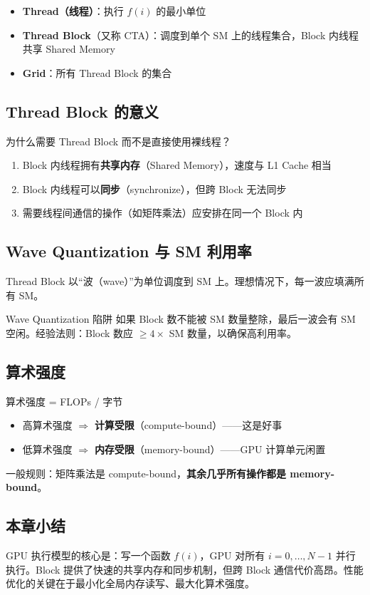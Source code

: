 \begin{itemize}
    \item \textbf{Thread（线程）}：执行 $f(i)$ 的最小单位
    \item \textbf{Thread Block}（又称 CTA）：调度到单个 SM 上的线程集合，Block 内线程共享 Shared Memory
    \item \textbf{Grid}：所有 Thread Block 的集合
\end{itemize}

\subsection{Thread Block 的意义}

为什么需要 Thread Block 而不是直接使用裸线程？
\begin{enumerate}
    \item Block 内线程拥有\textbf{共享内存}（Shared Memory），速度与 L1 Cache 相当
    \item Block 内线程可以\textbf{同步}（synchronize），但跨 Block 无法同步
    \item 需要线程间通信的操作（如矩阵乘法）应安排在同一个 Block 内
\end{enumerate}

\subsection{Wave Quantization 与 SM 利用率}

Thread Block 以``波（wave）''为单位调度到 SM 上。理想情况下，每一波应填满所有 SM。

\begin{warningbox}{Wave Quantization 陷阱}
如果 Block 数不能被 SM 数量整除，最后一波会有 SM 空闲。经验法则：Block 数应 $\geq 4 \times$ SM 数量，以确保高利用率。
\end{warningbox}

\subsection{算术强度}

\begin{importantbox}{算术强度 = FLOPs / 字节}
\begin{itemize}
    \item 高算术强度 $\Rightarrow$ \textbf{计算受限}（compute-bound）——这是好事
    \item 低算术强度 $\Rightarrow$ \textbf{内存受限}（memory-bound）——GPU 计算单元闲置
\end{itemize}
一般规则：矩阵乘法是 compute-bound，\textbf{其余几乎所有操作都是 memory-bound}。
\end{importantbox}

\subsection{本章小结}

GPU 执行模型的核心是：写一个函数 $f(i)$，GPU 对所有 $i = 0, \dots, N-1$ 并行执行。Block 提供了快速的共享内存和同步机制，但跨 Block 通信代价高昂。性能优化的关键在于最小化全局内存读写、最大化算术强度。


